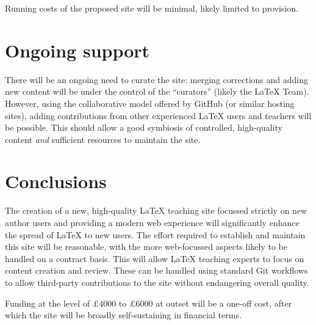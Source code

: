 \documentclass{article}
\begin{document}
Running costs of the proposed site will be minimal, likely limited
to  provision.

\section{Ongoing support}

There will be an ongoing need to curate the site: merging corrections and
adding new content will be under the control of the \enquote{curators} (likely
the \LaTeX{} Team). However, using the collaborative model offered by GitHub
(or similar hosting sites), adding contributions from other experienced
\LaTeX{} users and teachers will be possible. This should allow a good
symbiosis of controlled, high-quality content \emph{and} sufficient resources
to maintain the site.

\section{Conclusions}

The creation of a new, high-quality \LaTeX{} teaching site focussed strictly on new author users and
providing a modern web experience will significantly enhance the spread of
\LaTeX{} to new users. The effort required to establish and maintain this site
will be reasonable, with the more web-focussed aspects likely to be
handled on a contract basis. This will allow  \LaTeX{} teaching experts to
focus on content creation and review. These can be handled using standard
Git workflows to allow third-party contributions
to the site without endangering overall quality.

Funding at the level of \pounds 4000 to \pounds 6000 at outset will be a
one-off cost, after which the site will be broadly self-sustaining in
financial terms.
\end{document}
